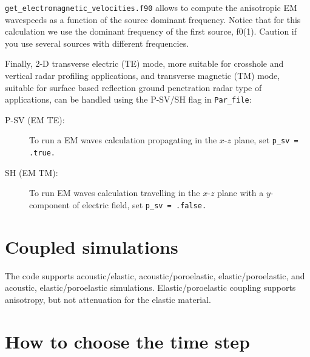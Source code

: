 \begin{description}[style=nextline, labelindent=1em, font=\normalfont]
\end{description}

\texttt{get\_electromagnetic\_velocities.f90} allows to compute the anisotropic EM wavespeeds as a function of
the source dominant frequency. Notice that for this calculation we use the dominant frequency of the first source, f0(1). Caution if you use
several sources with different frequencies.

Finally, 2-D transverse electric (TE) mode, more suitable for crosshole and vertical radar profiling applications, and transverse magnetic (TM) mode, suitable for surface based reflection ground penetration radar type of applications, can be handled using the P-SV/SH flag in \texttt{Par\_file}: 
\begin{description}
\item[P-SV (EM TE):]
To run a EM waves calculation propagating in the $x$-$z$ plane,
set \texttt{p\_sv = .true.}

\item[SH (EM TM):]
To run EM waves calculation travelling in the $x$-$z$ plane with a
$y$-component of electric field, set \texttt{p\_sv = .false.}
\end{description}



\section{Coupled simulations}

The code supports acoustic/elastic, acoustic/poroelastic, elastic/poroelastic,
and acoustic, elastic/poroelastic simulations.
Elastic/poroelastic coupling supports anisotropy, but not attenuation for the
elastic material.


\section{How to choose the time step}

